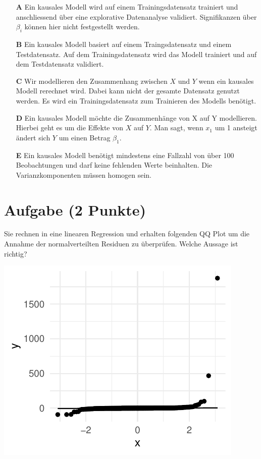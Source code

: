 \documentclass[a4paper, 9pt]{scrartcl}\usepackage[]{graphicx}\usepackage[]{xcolor}
\makeatletter
\def\maxwidth{ %
  \ifdim\Gin@nat@width>\linewidth
    \linewidth
  \else
    \Gin@nat@width
  \fi
}
\makeatother
\begin{document}
\begin{enumerate}
\item [\textbf{A} \msquare] Ein kausales Modell wird auf einem Trainingsdatensatz trainiert und anschliessend über eine explorative Datenanalyse validiert. Signifikanzen über $\beta_i$ können hier nicht festgestellt werden.
\item [\textbf{B} \msquare] Ein kausales Modell basiert auf einem Traingsdatensatz und einem Testdatensatz. Auf dem Trainingsdatensatz wird das Modell trainiert und auf dem Testdatensatz validiert.
\item [\textbf{C} \msquare] Wir modellieren den Zusammenhang zwischen $X$ und $Y$ wenn ein kausales Modell rerechnet wird. Dabei kann nicht der gesamte Datensatz genutzt werden. Es wird ein Trainingsdatensatz zum Trainieren des Modells benötigt.
\item [\textbf{D} \msquare] Ein kausales Modell möchte die Zusammenhänge von X auf Y modellieren. Hierbei geht es um die Effekte von $X$ auf $Y$. Man sagt, wenn $x_1$ um 1 ansteigt ändert sich $Y$ um einen Betrag $\beta_1$.
\item [\textbf{E} \msquare] Ein kausales Modell benötigt mindestens eine Fallzahl von über 100 Beobachtungen und darf keine fehlenden Werte beinhalten. Die Varianzkomponenten müssen homogen sein.
\end{enumerate}

\section{Aufgabe \hfill (2 Punkte)}



Sie rechnen in eine linearen Regression und erhalten folgenden QQ Plot um die Annahme der normalverteilten Residuen zu überprüfen. Welche Aussage ist richtig?



{\centering \includegraphics[width=\maxwidth]{img/mc-regression-05-a-1} 

}
\end{document}
